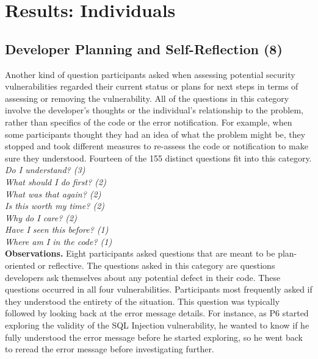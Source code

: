 \documentclass[conference]{IEEEtran}
\begin{document}
\section{Results: Individuals}
\label{sec:results-i}



\noindent\subsection{\textbf{Developer Planning and Self-Reflection (8)}} \label{dpr}

Another kind of question participants asked when assessing potential security vulnerabilities regarded their current status or plans for next steps in terms of assessing or removing the vulnerability. 
All of the questions in this category involve the developer's thoughts or the individual's relationship to the problem, rather than specifics of the code or the error notification.
For example, when some participants thought they had an idea of what the problem might be, they stopped and took different measures to re-assess the code or notification to make sure they understood.
Fourteen of the 155 distinct questions fit into this category. 
\\

\noindent\emph{Do I understand? (3)} \\
\emph{What should I do first? (2)} \\
\emph{What was that again? (2)} \\
\emph{Is this worth my time? (2)} \\
\emph{Why do I care? (2)} \\
\emph{Have I seen this before? (1)} \\
\emph{Where am I in the code? (1)} \\



\noindent\textbf{Observations.}
Eight participants asked questions that are meant to be plan-oriented or reflective.
The questions asked in this category are questions developers ask themselves about any potential defect in their code. 
These questions occurred in all four vulnerabilities.
Participants most frequently asked if they understood the entirety of the situation. 
This question was typically followed by looking back at the error message details. 
For instance, as P6 started exploring the validity of the SQL Injection vulnerability, he wanted to know if he fully understood the error message before he started exploring, so he went back to reread the error message before investigating further.
\\
\end{document}
